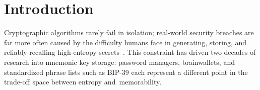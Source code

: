 \documentclass[mathematics,article,accept,pdftex,moreauthors]{Definitions/mdpi}
\begin{document}




\section{Introduction}

{Cryptographic algorithms rarely fail in isolation; real-world security breaches are far more often caused by the difficulty humans face in generating, storing, and reliably recalling high-entropy secrets~\cite{Adams1999}. This constraint has driven two decades of research into mnemonic key storage: password managers, brainwallets, and standardized phrase lists such as BIP-39 each represent a different point in the trade-off space between entropy \mbox{and memorability.}}
\end{document}
